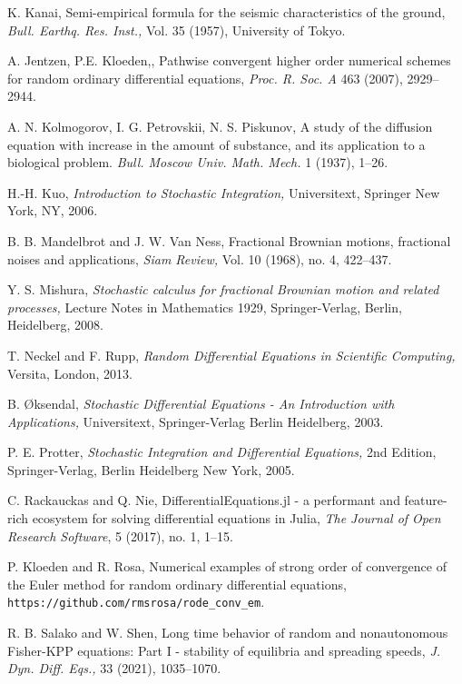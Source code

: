 \documentclass[reqno,12pt]{amsart}
\theoremstyle{plain} %
\theoremstyle{definition} %
\begin{document}
\begin{thebibliography}{25}
     K. Kanai, Semi-empirical formula for the seismic characteristics of the ground, \emph{Bull. Earthq. Res. Inst.,} Vol. 35 (1957), University of Tokyo.

     A. Jentzen, P.E. Kloeden,, Pathwise convergent higher order numerical schemes for random ordinary differential equations, \emph{Proc. R. Soc. A} 463 (2007), 2929--2944.

     A. N. Kolmogorov, I. G. Petrovskii, N. S. Piskunov, A study of the diffusion equation with increase in the amount of substance, and its application to a biological problem. \emph{Bull. Moscow Univ. Math. Mech.} 1 (1937), 1--26.

     H.-H. Kuo, \emph{Introduction to Stochastic Integration,} Universitext, Springer New York, NY, 2006.

     B. B. Mandelbrot and J. W. Van Ness, Fractional Brownian motions, fractional noises and applications, \emph{Siam Review,} Vol. 10 (1968), no. 4, 422--437.

     Y. S. Mishura, \emph{Stochastic calculus for fractional Brownian motion and related processes,} Lecture Notes in Mathematics 1929, Springer-Verlag, Berlin, Heidelberg, 2008.

     T. Neckel and F. Rupp, \emph{Random Differential Equations in Scientific Computing,} Versita, London, 2013.

     B. {\O}ksendal, \emph{Stochastic Differential Equations - An Introduction with Applications,} Universitext, Springer-Verlag Berlin Heidelberg, 2003.

     P. E. Protter, \emph{Stochastic Integration and Differential Equations,} 2nd Edition, Springer-Verlag, Berlin Heidelberg New York, 2005.

     C. Rackauckas and Q. Nie, DifferentialEquations.jl - a performant and feature-rich ecosystem for solving differential equations in Julia, \emph{The Journal of Open Research Software}, 5 (2017), no. 1, 1--15.

     P. Kloeden and R. Rosa, Numerical examples of strong order of convergence of the Euler method for random ordinary differential equations, \texttt{https://github.com/rmsrosa/rode\_conv\_em}.

     R. B. Salako and W. Shen, Long time behavior of random and nonautonomous Fisher-KPP equations: Part I - stability of equilibria and spreading speeds, \emph{J. Dyn. Diff. Eqs.,} 33 (2021), 1035--1070.


\end{thebibliography}
\end{document}
